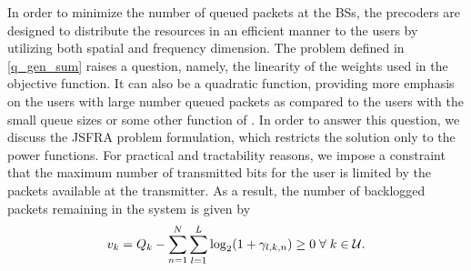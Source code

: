 In order to minimize the number of queued packets at the \acp{BS}, the precoders  are designed to distribute the resources in an efficient manner to the users by utilizing both spatial and frequency dimension. The problem defined in \eqref{q_gen_sum} raises a question, namely, the linearity of the weights used in the objective function. It can also be a quadratic function, providing more emphasis on the users with large number queued packets as compared to the users with the small queue sizes or some other function of . In order to answer this question, we discuss the \ac{JSFRA} problem formulation, which restricts the solution only to the power functions. For practical and tractability reasons, we impose a constraint that the maximum number of transmitted bits for the user  is limited by the packets available at the transmitter. As a result, the number of backlogged packets remaining in the system is given by
\begin{equation}
v_k =  Q_k - \sum_{n = 1}^N \sum_{l = 1}^{L} \log_2(1+\gamma_{l,k,n}) \geq 0 \fall k \in \mathcal{U}.
\label{eqn-4.2}
\end{equation}

